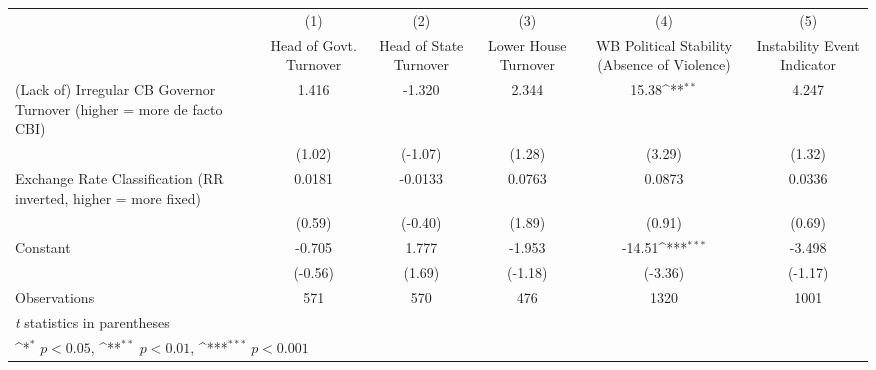 {
\def\sym#1{\ifmmode^{#1}\else\(^{#1}\)\fi}
\begin{tabular}{l*{5}{c}}
\hline\hline
                &\multicolumn{1}{c}{(1)}&\multicolumn{1}{c}{(2)}&\multicolumn{1}{c}{(3)}&\multicolumn{1}{c}{(4)}&\multicolumn{1}{c}{(5)}\\
                &\multicolumn{1}{c}{Head of Govt. Turnover}&\multicolumn{1}{c}{Head of State Turnover}&\multicolumn{1}{c}{Lower House Turnover}&\multicolumn{1}{c}{WB Political Stability (Absence of Violence)}&\multicolumn{1}{c}{Instability Event Indicator}\\
\hline
(Lack of) Irregular CB Governor Turnover (higher = more de facto CBI)&    1.416         &   -1.320         &    2.344         &    15.38\sym{**} &    4.247         \\
                &   (1.02)         &  (-1.07)         &   (1.28)         &   (3.29)         &   (1.32)         \\
[1em]
Exchange Rate Classification (RR inverted, higher = more fixed)&   0.0181         &  -0.0133         &   0.0763         &   0.0873         &   0.0336         \\
                &   (0.59)         &  (-0.40)         &   (1.89)         &   (0.91)         &   (0.69)         \\
[1em]
Constant        &   -0.705         &    1.777         &   -1.953         &   -14.51\sym{***}&   -3.498         \\
                &  (-0.56)         &   (1.69)         &  (-1.18)         &  (-3.36)         &  (-1.17)         \\
\hline
Observations    &      571         &      570         &      476         &     1320         &     1001         \\
\hline\hline
\multicolumn{6}{l}{\footnotesize \textit{t} statistics in parentheses}\\
\multicolumn{6}{l}{\footnotesize \sym{*} \(p<0.05\), \sym{**} \(p<0.01\), \sym{***} \(p<0.001\)}\\
\end{tabular}
}
